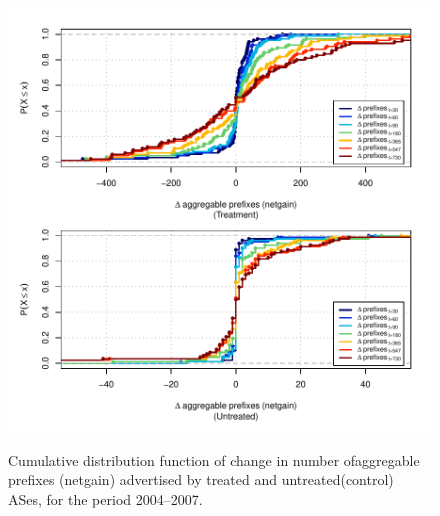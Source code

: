 \begin{figure}[H]
\begin{centering}
\begin{singlespace}
    \includegraphics[width=6in]{figures/behavior-netgain-2004_2007-corr.pdf}
    \vspace{-2em}\\
    \caption{Cumulative distribution function of change in number ofaggregable prefixes (netgain) advertised by treated and untreated(control) ASes, for the period 2004--2007.}
\end{singlespace}
\end{centering}
\end{figure}
